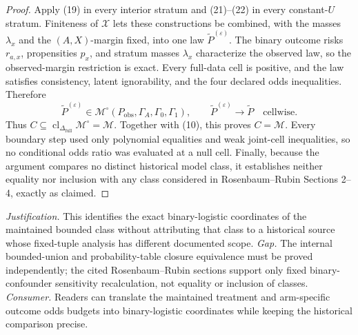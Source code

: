 \documentclass{article}
\begin{document}
\begin{proof}
Apply (19) in every interior stratum and (21)--(22) in every constant-\(U\) stratum.  Finiteness of \(\mathcal X\) lets these constructions be combined, with the masses \(\lambda_x\) and the \((A,X)\)-margin fixed, into one law \(\widetilde P^{(\varepsilon)}\).  The binary outcome risks \(r_{a,x}\), propensities \(p_x\), and stratum masses \(\lambda_x\) characterize the observed law, so the observed-margin restriction is exact.  Every full-data cell is positive, and the law satisfies consistency, latent ignorability, and the four declared odds inequalities.  Therefore
\[
\widetilde P^{(\varepsilon)}
\in\mathcal M^{\circ}(P_{\mathrm{obs}},\Gamma_A,\Gamma_0,\Gamma_1),
\qquad
\widetilde P^{(\varepsilon)}\longrightarrow\widetilde P
\quad\text{cellwise}.                                    \tag{23}
\]
Thus \(C\subseteq\operatorname{cl}_{\Delta_{\mathrm{full}}}\mathcal M^{\circ}=\mathcal M\).  Together with (10), this proves \(C=\mathcal M\).  Every boundary step used only polynomial equalities and weak joint-cell inequalities, so no conditional odds ratio was evaluated at a null cell.  Finally, because the argument compares no distinct historical model class, it establishes neither equality nor inclusion with any class considered in Rosenbaum--Rubin Sections 2--4, exactly as claimed.
\end{proof}
\par\smallskip\noindent \textit{Justification.} This identifies the exact binary-logistic coordinates of the maintained bounded class without attributing that class to a historical source whose fixed-tuple analysis has different documented scope. \textit{Gap.} The internal bounded-union and probability-table closure equivalence must be proved independently; the cited Rosenbaum--Rubin sections support only fixed binary-confounder sensitivity recalculation, not equality or inclusion of classes. \textit{Consumer.} Readers can translate the maintained treatment and arm-specific outcome odds budgets into binary-logistic coordinates while keeping the historical comparison precise.
\end{document}
